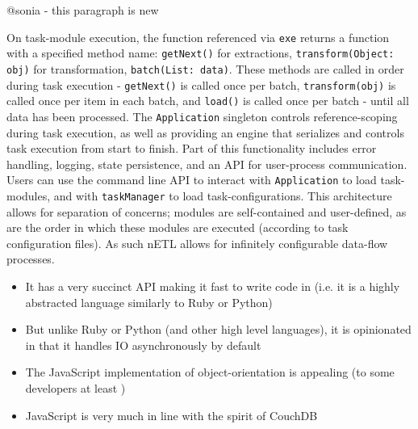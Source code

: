 @sonia - this paragraph is new

On task-module execution, the function referenced via \texttt{exe} returns a function with a specified method name: \texttt{getNext()} for extractions, \texttt{transform(Object: obj)} for transformation, \texttt{batch(List: data)}. These methods are called in order during task execution - \texttt{getNext()} is called once per batch, \texttt{transform(obj)} is called once per item in each batch, and \texttt{load()} is called once per batch - until all data has been processed. The \texttt{Application} singleton controls reference-scoping during task execution, as well as providing an engine that serializes and controls task execution from start to finish. Part of this functionality includes error handling, logging, state persistence, and an API for user-process communication. Users can use the command line API to interact with \texttt{Application} to load task-modules, and with \texttt{taskManager} to load task-configurations. This architecture allows for separation of concerns; modules are self-contained and user-defined, as are the order in which these modules are executed (according to task configuration files). As such nETL allows for infinitely configurable data-flow processes.

\begin{itemize}
    \item It has a very succinct API making it fast to write code in (i.e. it is a highly abstracted language similarly to Ruby or Python)
    \item But unlike Ruby or Python (and other high level languages), it is opinionated in that it handles IO asynchronously by default
    \item The JavaScript implementation of object-orientation is appealing (to some developers at least \cite{xxx})
    \item JavaScript is very much in line with the spirit of CouchDB
\end{itemize}